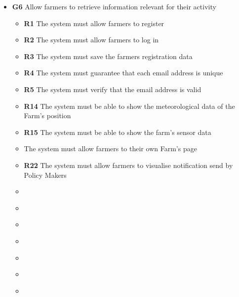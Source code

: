 \begin{itemize}
\item \textbf{G6} Allow farmers to retrieve information relevant for their activity
    \begin{itemize}
    \renewcommand\labelitemi{--}
    \item \textbf{R1} The system must allow farmers to register
    \item \textbf{R2} The system must allow farmers to log in
    \item \textbf{R3} The system must save the farmers registration data
    \item \textbf{R4} The system must guarantee that each email address is unique
    \item \textbf{R5} The system must verify that the email address is valid
    \item \textbf{R14} The system must be able to show the meteorological data of the Farm’s position
    \item \textbf{R15} The system must be able to show the farm’s sensor data
    \item \textbf{} The system must allow farmers to their own Farm's page
    \item \textbf{R22} The system must allow farmers to visualise notification send by Policy Makers
    \item \textbf{}
    \item \textbf{}
    \item \textbf{}
    \item \textbf{}
    \item \textbf{}
    \item \textbf{}
    \item \textbf{}
    \end{itemize} 
    

\end{itemize}
